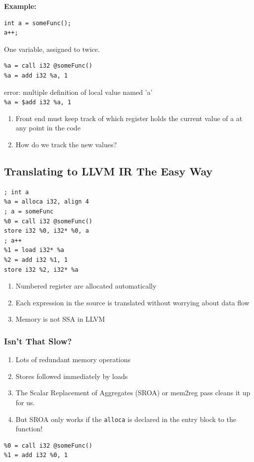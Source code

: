 \documentclass[a4paper]{exam}
\theoremstyle{definition}
\begin{document}
\textbf{Example:}
\begin{verbatim}
int a = someFunc();
a++;
\end{verbatim}
One variable, assigned to twice.
\begin{verbatim}
%a = call i32 @someFunc()
%a = add i32 %a, 1
\end{verbatim}
error: multiple definition of local value named 'a'\\
\texttt{\%a = \$add i32 \%a, 1}
\begin{enumerate}
  \item Front end must keep track of which register holds the current value of a at any point in the code
  \item How do we track the new values?
\end{enumerate}
\subsection{Translating to LLVM IR The Easy Way}
\begin{verbatim}
; int a
%a = alloca i32, align 4
; a = someFunc
%0 = call i32 @someFunc()
store i32 %0, i32* %0, a
; a++
%1 = load i32* %a
%2 = add i32 %1, 1
store i32 %2, i32* %a
\end{verbatim}
\begin{enumerate}
  \item Numbered register are allocated automatically
  \item  Each expression in the source is translated without worrying
        about data flow
  \item  Memory is not SSA in LLVM
\end{enumerate}
\subsubsection{Isn't That Slow?}
\begin{enumerate}
  \item Lots of redundant memory operations
  \item Stores followed immediately by loads
  \item The Scalar Replacement of Aggregates (SROA) or mem2reg pass cleans it up for us.
  \item But SROA only works if the \texttt{alloca} is declared in the entry block to the function!
\end{enumerate}
\begin{verbatim}
%0 = call i32 @someFunc()
%1 = add i32 %0, 1
\end{verbatim}
\end{document}
